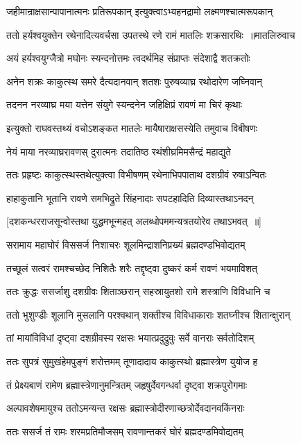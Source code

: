 \twolineshloka
{जहीमान्राक्षसान्पापानात्मनः प्रतिरूपकान्}
{इत्युक्त्वाऽभ्यहनद्रामो लक्ष्मणश्चात्मरूपकान्}


\threelineshloka
{ततो हर्यश्वयुक्तेन रथेनादित्यवर्चसा}
{उपतस्थे रणे रामं मातलिः शक्रसारथिः ॥मातलिरुवाच}
{}


\twolineshloka
{अयं हर्यश्वयुग्जैत्रो मघोनः स्यन्दनोत्तमः}
{त्वदर्थमिह संप्राप्तः संदेशाद्वै शतक्रतोः}


\twolineshloka
{अनेन शक्रः काकुत्स्थ समरे दैत्यदानवान्}
{शतशः पुरुषव्याघ्र रथोदारेण जघ्निवान्}


\twolineshloka
{तदनन नरव्याघ्र मया यत्तेन संयुगे}
{स्यन्दनेन जहिक्षिप्रं रावणं मा चिरं कृथाः}


\twolineshloka
{इत्युक्तो राघवस्तथ्यं वचोऽशङ्कत मातलेः}
{मायैषाराक्षसस्येति तमुवाच विबीषणः}


\twolineshloka
{नेयं माया नरव्याघ्ररावणस् दुरात्मनः}
{तदातिष्ठ रथंशीघ्रमिमसैन्द्रं महाद्युते}


\twolineshloka
{ततः प्रहृष्टः काकुत्स्थस्तथेत्युक्त्वा विभीषणम्}
{रथेनाभिपपाताथ दशग्रीवं रुषाऽन्वितः}


\twolineshloka
{हाहाकुतानि भूतानि रावणे समभिद्रुते}
{सिंहनादाः सपटहादिति दिव्यास्तथाऽनदन्}


\twolineshloka
{[दशकन्धरराजसून्वोस्तथा युद्धमभून्महत्}
{अलब्धोपममन्यत्रतयोरेव तथाऽभवत् ॥]}


\twolineshloka
{सरामाय महाघोरं विससर्ज निशाचरः}
{शूलमिन्द्राशनिप्रख्यं ब्रह्मदण्डभिवोद्यतम्}


\twolineshloka
{तच्छूलं सत्वरं रामश्चच्छेद निशितैः शरैः}
{तद्दृष्ट्वा दुष्करं कर्म रावणं भयमाविशत्}


\twolineshloka
{ततः क्रुद्धः ससर्जाशु दशग्रीवः शिताञ्छरान्}
{सहस्रायुतशो रामे शस्त्राणि विविधानि च}


\twolineshloka
{ततो भुशुण्डीः शूलानि मुसलानि परश्वथान्}
{शक्तीश्च विविधाकाराः शतघ्नीश्च शितान्क्षुरान्}


\twolineshloka
{तां मायांविविधां दृष्ट्वा दशग्रीवस्य रक्षसः}
{भयात्प्रदुद्रुवुः सर्वे वानराः सर्वतोदिशम्}


\twolineshloka
{ततः सुपत्रं सुमुखंहेमपुङ्गं शरोत्तमम्}
{तूणादादाय काकुत्स्थो ब्रह्मास्त्रेण युयोज ह}


\twolineshloka
{तं प्रेक्ष्यबाणं रामेण ब्रह्मास्त्रेणानुमन्त्रितम्}
{जहृषुर्देवगन्धर्वा दृष्ट्वा शक्रपुरोगमाः}


\twolineshloka
{अल्पावशेषमायुश्च ततोऽमन्यन्त रक्षसः}
{ब्रह्मास्त्रोदीरणाच्छत्रोर्देवदानवकिंनराः}


\twolineshloka
{ततः ससर्ज तं रामः शरमप्रतिमौजसम्}
{रावणान्तकरं घोरं ब्रह्मदण्डमिवोद्यतम्}


